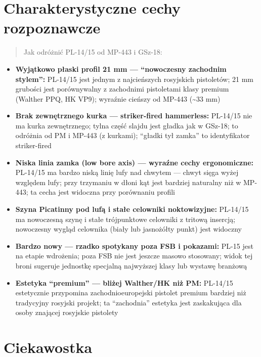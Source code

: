 \documentclass[12pt,openany,oneside]{book}
\providecommand{\tightlist}{%
  \setlength{\itemsep}{0pt}\setlength{\parskip}{0pt}}
\begin{document}
\section{Charakterystyczne cechy
rozpoznawcze}\label{charakterystyczne-cechy-rozpoznawcze-98}

\begin{quote}
Jak odróżnić PL-14/15 od MP-443 i GSz-18:
\end{quote}

\begin{itemize}
\tightlist
\item
  \textbf{Wyjątkowo płaski profil 21 mm --- ``nowoczesny zachodnim
  stylem'':} PL-14/15 jest jednym z najcieńszych rosyjskich pistoletów;
  21 mm grubości jest porównywalny z zachodnimi pistoletami klasy
  premium (Walther PPQ, HK VP9); wyraźnie cieńszy od MP-443
  (\textasciitilde33 mm)
\item
  \textbf{Brak zewnętrznego kurka --- striker-fired hammerless:}
  PL-14/15 nie ma kurka zewnętrznego; tylna część slajdu jest gładka jak
  w GSz-18; to odróżnia od PM i MP-443 (z kurkami); ``gładki tył zamka''
  to identyfikator striker-fired
\item
  \textbf{Niska linia zamka (low bore axis) --- wyraźne cechy
  ergonomiczne:} PL-14/15 ma bardzo niską linię lufy nad chwytem ---
  chwyt sięga wyżej względem lufy; przy trzymaniu w dłoni kąt jest
  bardziej naturalny niż w MP-443; ta cecha jest widoczna przy
  porównaniu profili
\item
  \textbf{Szyna Picatinny pod lufą i stałe celowniki noktowizyjne:}
  PL-14/15 ma nowoczesną szynę i stałe trójpunktowe celowniki z tritową
  insercją; nowoczesny wygląd celownika (biały lub jasnożółty punkt)
  jest widoczny
\item
  \textbf{Bardzo nowy --- rzadko spotykany poza FSB i pokazami:} PL-15
  jest na etapie wdrożenia; poza FSB nie jest jeszcze masowo stosowany;
  widok tej broni sugeruje jednostkę specjalną najwyższej klasy lub
  wystawę branżową
\item
  \textbf{Estetyka ``premium'' --- bliżej Walther/HK niż PM:} PL-14/15
  estetycznie przypomina zachodnioeuropejski pistolet premium bardziej
  niż tradycyjny rosyjski projekt; ta ``zachodnia'' estetyka jest
  zaskakująca dla osoby znającej rosyjskie pistolety
\end{itemize}

\section{Ciekawostka}\label{ciekawostka-98}
\end{document}
